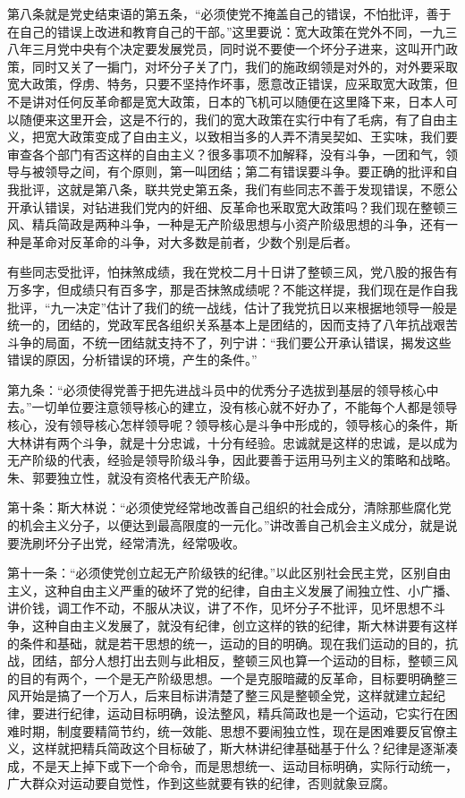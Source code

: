 第八条就是党史结束语的第五条，“必须使党不掩盖自己的错误，不怕批评，善于在自己的错误上改进和教育自己的干部。”这里要说：宽大政策在党外不同，一九三八年三月党中央有个决定要发展党员，同时说不要使一个坏分子进来，这叫开门政策，同时又关了一掮门，对坏分子关了门，我们的施政纲领是对外的，对外要采取宽大政策，俘虏、特务，只要不坚持作坏事，愿意改正错误，应采取宽大政策，但不是讲对任何反革命都是宽大政策，日本的飞机可以随便在这里降下来，日本人可以随便来这里开会，这是不行的，我们的宽大政策在实行中有了毛病，有了自由主义，把宽大政策变成了自由主义，以致相当多的人弄不清吴契如、王实味，我们要审查各个部门有否这样的自由主义？很多事项不加解释，没有斗争，一团和气，领导与被领导之间，有个原则，第一叫团结；第二有错误要斗争。要正确的批评和自我批评，这就是第八条，联共党史第五条，我们有些同志不善于发现错误，不愿公开承认错误，对钻进我们党内的奸细、反革命也釆取宽大政策吗？我们现在整顿三风、精兵简政是两种斗争，一种是无产阶级思想与小资产阶级思想的斗争，还有一种是革命对反革命的斗争，对大多数是前者，少数个别是后者。

有些同志受批评，怕抹煞成绩，我在党校二月十日讲了整顿三风，党八股的报告有万多字，但成绩只有百多字，那是否抹煞成绩呢？不能这样提，我们现在是作自我批评，“九一决定”估计了我们的统一战线，估计了我党抗日以来根据地领导一般是统一的，团结的，党政军民各组织关系基本上是团结的，因而支持了八年抗战艰苦斗争的局面，不统一团结就支持不了，列宁讲：“我们要公开承认错误，揭发这些错误的原因，分析错误的环境，产生的条件。”

第九条：“必须使得党善于把先进战斗员中的优秀分子选拔到基层的领导核心中去。”一切单位要注意领导核心的建立，没有核心就不好办了，不能每个人都是领导核心，没有领导核心怎样领导呢？领导核心是斗争中形成的，领导核心的条件，斯大林讲有两个斗争，就是十分忠诚，十分有经验。忠诚就是这样的忠诚，是以成为无产阶级的代表，经验是领导阶级斗争，因此要善于运用马列主义的策略和战略。朱、郭要独立性，就没有资格代表无产阶级。

第十条：斯大林说：“必须使党经常地改善自己组织的社会成分，清除那些腐化党的机会主义分子，以便达到最高限度的一元化。”讲改善自己机会主义成分，就是说要洗刷坏分子出党，经常清洗，经常吸收。

第十一条：“必须使党创立起无产阶级铁的纪律。”以此区别社会民主党，区别自由主义，这种自由主义严重的破坏了党的纪律，自由主义发展了闹独立性、小广播、讲价钱，调工作不动，不服从决议，讲了不作，见坏分子不批评，见坏思想不斗争，这种自由主义发展了，就没有纪律，创立这样的铁的纪律，斯大林讲要有这样的条件和基础，就是若干思想的统一，运动的目的明确。现在我们运动的目的，抗战，团结，部分人想打出去则与此相反，整顿三风也算一个运动的目标，整顿三风的目的有两个，一个是无产阶级思想。一个是克服暗藏的反革命，目标要明确整三风开始是搞了一个万人，后来目标讲清楚了整三风是整顿全党，这样就建立起纪律，要进行纪律，运动目标明确，设法整风，精兵简政也是一个运动，它实行在困难时期，制度要精简节约，统一效能、思想不要闹独立性，现在是困难要反官僚主义，这样就把精兵简政这个目标破了，斯大林讲纪律基础基于什么？纪律是逐渐凑成，不是天上掉下或下一个命令，而是思想统一、运动目标明确，实际行动统一，广大群众对运动要自觉性，作到这些就要有铁的纪律，否则就象豆腐。

